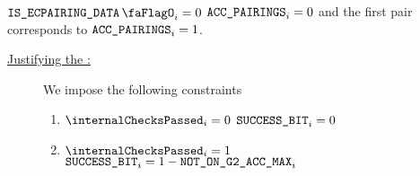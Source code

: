 \saNote{} \If $\isEcpairingData_{i} = 0$ \Then $\texttt{ACC\_PAIRINGS}_{i} = 0$ and the first pair corresponds to $\texttt{ACC\_PAIRINGS}_{i} = 1$.
\begin{description}
    \item[\underline{Justifying the \ecdataSuccessBit{}:}]
          We impose the following constraints
          \begin{enumerate}
              \item \If $\internalChecksPassed _{i}= 0$ \Then $\texttt{SUCCESS\_BIT} _{i} = 0$
              \item \If $\internalChecksPassed _{i}= 1$  \Then $\texttt{SUCCESS\_BIT}_{i} = 1 - \texttt{NOT\_ON\_G2\_ACC\_MAX} _{i}$
          \end{enumerate}
\end{description}
